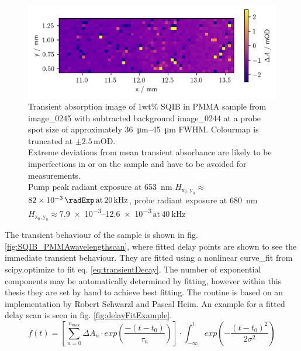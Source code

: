 \documentclass[twoside,openright,listof=numbered]{scrreprt}
\def\pumpExp#1{\ensuremath{\SI{#1}{\radExp}\,\mathrm{at}\, \SI{20}{\kilo\hertz}}}
\def\frep#1{\ensuremath{\,\mathrm{at}\, \SI{#1}{\kilo\hertz}}}
\def\radiantExp{\ensuremath{H_\mathrm{x_0,y_0}}}
\begin{document}
\begin{figure}[hbt]
\centering
\includegraphics[scale=1]{images/1percentSQIBinPMMA_Sample653-680Image.png}
\caption[Transient absorption image of 1wt\% SQIB in PMMA sample from image\_0245 with subtracted background image\_0244 for pump \qty{653}{\nano\meter} and probe \qty{680}{\nano\meter}.]{Transient absorption image of 1wt\% SQIB in PMMA sample from image\_0245 with subtracted background image\_0244 at a probe spot size of approximately \SIrange{36}{45}{\micro\meter} FWHM. Colourmap is truncated at $\pm2.5\,\text{mOD}$.\\ Extreme deviations from mean transient absorbance are likely to be imperfections in or on the sample and have to be avoided for measurements.\\ Pump peak radiant exposure at \SI{653}{\nano\meter} $\radiantExp\approx$ \pumpExp{82e-3}, probe radiant exposure at \SI{680}{\nano\meter} $\radiantExp\approx$\SIrange{7.9e-3}{12.6e-3}{\radExp}\frep{40} \label{fig:TA_image_sample}}
\end{figure}

The transient behaviour of the sample is shown in fig. \ref{fig:SQIB_PMMAwavelengthscan}, where fitted delay points are shown to see the immediate transient behaviour. They are fitted using a nonlinear curve\_fit from scipy.optimize to fit eq. \ref{eq:transientDecay}. The number of exponential components may be automatically determined by fitting, however within this thesis they are set by hand to achieve best fitting. The routine is based on an implementation by Robert Schwarzl and Pascal Heim. An example for a fitted delay scan is seen in fig. \ref{fig:delayFitExample}.
\begin{equation}\label{eq:transientDecay}
f(t) = \left[\sum_{n=0}^{n_\text{max}} \Delta A_n\cdot exp \left(\frac{-(t-t_0)}{\tau_n}\right)\right]\cdot \int_{-\infty}^t exp\left(-\frac{(t-t_0)^2}{2\sigma^2}\right)
\end{equation}
\end{document}
